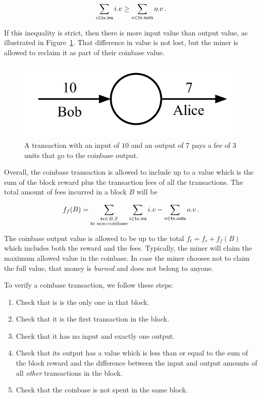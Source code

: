 \[
    \sum_{i \in \mathsf{tx}\textsf{.ins}} i.v \geq \sum_{o \in \mathsf{tx}\textsf{.outs}} o.v\,.
\]

If this inequality is strict, then there is more input value than output value, as illustrated
in Figure~\ref{fig.fee}. That difference in value
is not lost, but the miner is allowed to reclaim it as part of their coinbase value.

\begin{figure}[h]
    \centering
    \includegraphics[width=0.4 \columnwidth,keepaspectratio]{figures/fee.pdf}
    \caption{A transaction with an input of $10$ and an output of $7$ pays a fee of $3$ units that
             go to the coinbase output.}
    \label{fig.fee}
\end{figure}

Overall, the coinbase transaction is allowed to include up to a value which is the sum of
the block reward plus the transaction fees of all the transactions. The total amount of fees
incurred in a block $B$ will be

\[
    f_f(B) = \sum_{\substack{\mathsf{tx} \in B\textsf{.}\overline{x}\\\mathsf{tx} \text{ non-coinbase}}}{\sum_{i \in \mathsf{tx}\textsf{.ins}} i.v - \sum_{o \in \mathsf{tx}\textsf{.outs}} o.v}\,.
\]

The coinbase output value is allowed to be up to the total $f_t = f_r + f_f(B)$ which includes both
the reward and the fees. Typically, the miner will claim the maximum allowed value in the coinbase.
In case the miner chooses not to claim the full value, that money is \emph{burned} and does not belong
to anyone.

To verify a coinbase transaction, we follow these steps:
\begin{enumerate}
    \item Check that is is the only one in that block.
    \item Check that it is the first transaction in the block.
    \item Check that it has no input and exactly one output.
    \item Check that its output has a value which is less than or equal to the sum of the block reward and the difference between the input and output amounts of all \emph{other} transactions in the block.
    \item Check that the coinbase is not spent in the same block.
\end{enumerate}

